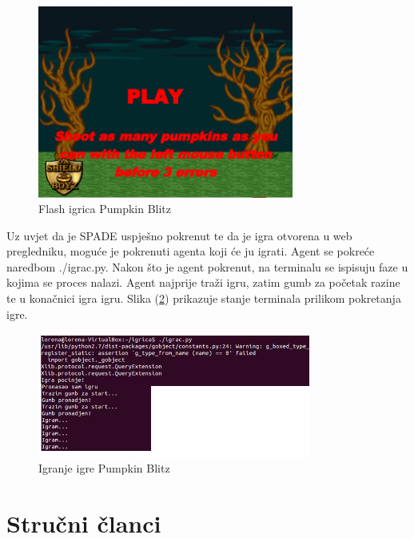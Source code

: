 \documentclass[a4paper,12pt]{foi}
\begin{document}
\begin{figure}[h]
\centering 
\includegraphics[width=0.75\textwidth]{igra.png}
\caption{Flash igrica Pumpkin Blitz}
\label{slika-7}
\end{figure}

Uz uvjet da je SPADE uspješno pokrenut te da je igra otvorena u web pregledniku, moguće je pokrenuti agenta koji će ju igrati. Agent se pokreće naredbom ./igrac.py. Nakon što je agent pokrenut, na terminalu se ispisuju faze u kojima se proces nalazi. Agent najprije traži igru, zatim gumb za početak razine te u konačnici igra igru. Slika (\ref{slika-8}) prikazuje stanje terminala prilikom pokretanja igre.

\begin{figure}[h]
\centering 
\includegraphics[width=0.80\textwidth]{igranje.png}
\caption{Igranje igre Pumpkin Blitz}
\label{slika-8}
\end{figure}

\chapter{Stručni članci}
\end{document}
